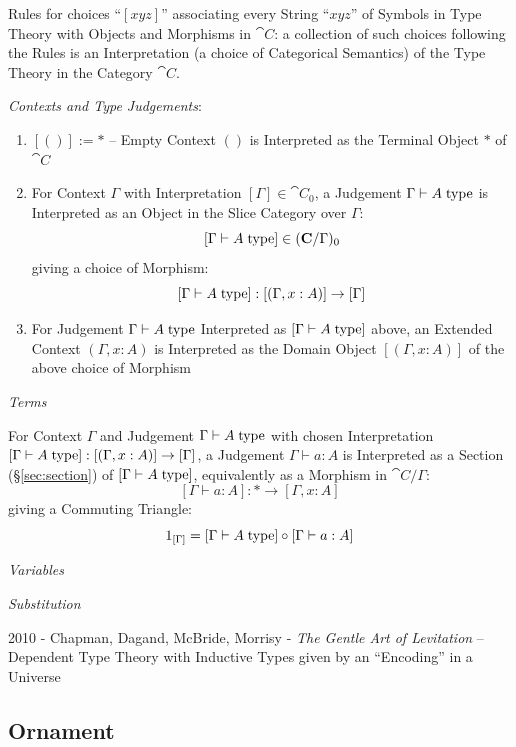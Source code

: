 Rules for choices ``$[xyz]$'' associating every String ``$xyz$'' of
Symbols in Type Theory with Objects and Morphisms in $\cat{C}$: a
collection of such choices following the Rules is an Interpretation (a
choice of Categorical Semantics) of the Type Theory in the Category
$\cat{C}$.

\emph{Contexts and Type Judgements}:
\begin{enumerate}
  \item $[()] := *$ -- Empty Context $()$ is Interpreted as the
    Terminal Object $*$ of $\cat{C}$
  \item For Context $\Gamma$ with Interpretation $[\Gamma] \in
    \cat{C}_0$, a Judgement $\Gamma \vdash A\;\mathrm{type}$ is Interpreted
    as an Object in the Slice Category over $\Gamma$:
    \[
      [\Gamma \vdash A\;\mathrm{type}] \in (\mathbf{C}/\Gamma)_0
    \]
    giving a choice of Morphism:
    \[
      [\Gamma \vdash A\;\mathrm{type}] : [(\Gamma,x:A)] \rightarrow [\Gamma]
    \]
  \item For Judgement $\Gamma \vdash A\;\mathrm{type}$ Interpreted as $[\Gamma
    \vdash A\;\mathrm{type}]$ above, an Extended Context $(\Gamma,x:A)$ is
    Interpreted as the Domain Object $[(\Gamma,x:A)]$ of the above
    choice of Morphism
\end{enumerate}

\emph{Terms}

For Context $\Gamma$ and Judgement $\Gamma \vdash A\;\mathrm{type}$ with chosen
Interpretation $[\Gamma \vdash A\;\mathrm{type}] : [(\Gamma,x:A)] \rightarrow
[\Gamma]$, a Judgement $\Gamma \vdash a:A$ is Interpreted as a Section
(\S\ref{sec:section}) of $[\Gamma \vdash A\;\mathrm{type}]$, equivalently as a
Morphism in $\cat{C}/\Gamma$:
\[
  [\Gamma \vdash a:A]: * \rightarrow [\Gamma,x:A]
\]
giving a Commuting Triangle:
\[
  1_{[\Gamma]} = [\Gamma \vdash A\;\mathrm{type}] \circ [\Gamma \vdash a:A]
\]

\emph{Variables}

\emph{Substitution}


\asterism


2010 - Chapman, Dagand, McBride, Morrisy - \emph{The Gentle Art of Levitation}
-- Dependent Type Theory with Inductive Types given by an ``Encoding'' in a
Universe



\subsection{Ornament}\label{sec:ornament}

